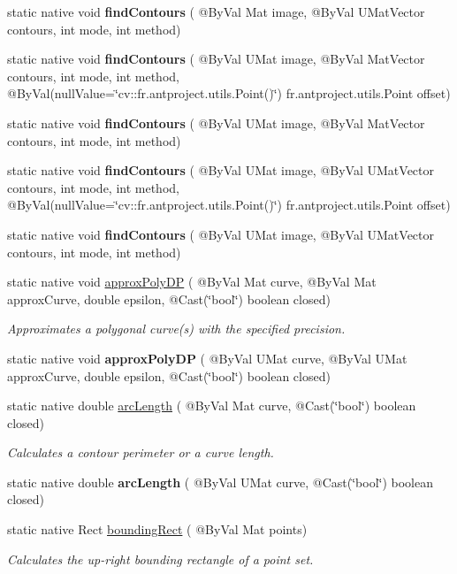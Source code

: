 \begin{DoxyCompactItemize}
\item 
static native void {\bfseries find\+Contours} ( @By\+Val Mat image, @By\+Val U\+Mat\+Vector contours, int mode, int method)
\item 
static native void {\bfseries find\+Contours} ( @By\+Val U\+Mat image, @By\+Val Mat\+Vector contours, int mode, int method, @By\+Val(null\+Value=\char`\"{}cv\+::\+fr.antproject.utils.Point()\char`\"{}) fr.antproject.utils.Point offset)
\item 
static native void {\bfseries find\+Contours} ( @By\+Val U\+Mat image, @By\+Val Mat\+Vector contours, int mode, int method)
\item 
static native void {\bfseries find\+Contours} ( @By\+Val U\+Mat image, @By\+Val U\+Mat\+Vector contours, int mode, int method, @By\+Val(null\+Value=\char`\"{}cv\+::\+fr.antproject.utils.Point()\char`\"{}) fr.antproject.utils.Point offset)
\item 
static native void {\bfseries find\+Contours} ( @By\+Val U\+Mat image, @By\+Val U\+Mat\+Vector contours, int mode, int method)
\item 
static native void \hyperlink{group__imgproc__shape_ga59b2a13c4f741e0898f8415d9436d8a0}{approx\+Poly\+DP} ( @By\+Val Mat curve, @By\+Val Mat approx\+Curve, double epsilon, @Cast(\char`\"{}bool\char`\"{}) boolean closed)
\begin{DoxyCompactList}\small\item\em Approximates a polygonal curve(s) with the specified precision. \end{DoxyCompactList}\item 
static native void {\bfseries approx\+Poly\+DP} ( @By\+Val U\+Mat curve, @By\+Val U\+Mat approx\+Curve, double epsilon, @Cast(\char`\"{}bool\char`\"{}) boolean closed)
\item 
static native double \hyperlink{group__imgproc__shape_gad6c8dc05432d5351a7480042bbbbe328}{arc\+Length} ( @By\+Val Mat curve, @Cast(\char`\"{}bool\char`\"{}) boolean closed)
\begin{DoxyCompactList}\small\item\em Calculates a contour perimeter or a curve length. \end{DoxyCompactList}\item 
static native double {\bfseries arc\+Length} ( @By\+Val U\+Mat curve, @Cast(\char`\"{}bool\char`\"{}) boolean closed)
\item 
static native Rect \hyperlink{group__imgproc__shape_ga8e749f0c2a90af2956b90b60689d6602}{bounding\+Rect} ( @By\+Val Mat points)
\begin{DoxyCompactList}\small\item\em Calculates the up-\/right bounding rectangle of a point set. \end{DoxyCompactList}\item 

\end{DoxyCompactItemize}
